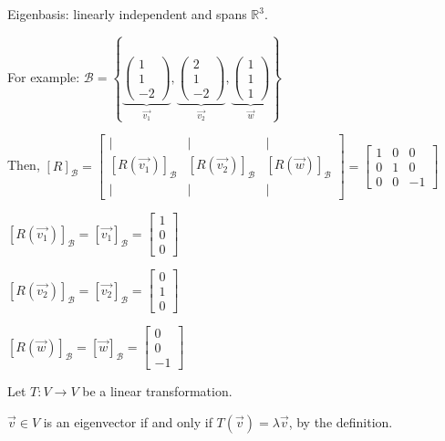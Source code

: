 \documentclass[11pt,fleqn]{book} %
\begin{document}
Eigenbasis: linearly independent and spans $\mathbb{R}^3$.

For example: $\mathcal{B} = \left\{
\underbrace{ \begin{pmatrix} 1\\1\\-2 \end{pmatrix} }_{\overrightarrow{v_1}},
\underbrace{ \begin{pmatrix} 2\\1\\-2 \end{pmatrix} }_{\overrightarrow{v_2}},
\underbrace{ \begin{pmatrix} 1\\1\\1 \end{pmatrix} }_{\overrightarrow{w}}
\right\}$

Then, $[R]_\mathcal{B} =
\begin{bmatrix} | &| &| \\ [R(\overrightarrow{v_1})]_\mathcal{B} &[R(\overrightarrow{v_2})]_\mathcal{B} &[R(\overrightarrow{w})]_\mathcal{B} \\ | &| &| \end{bmatrix} = \begin{bmatrix} 1 &0 &0 \\ 0 &1 &0 \\ 0 &0 &-1 \end{bmatrix}$

$[R(\overrightarrow{v_1})]_\mathcal{B} = [\overrightarrow{v_1}]_\mathcal{B} = \begin{bmatrix} 1\\0\\0 \end{bmatrix}$

$[R(\overrightarrow{v_2})]_\mathcal{B} = [\overrightarrow{v_2}]_\mathcal{B}=\begin{bmatrix} 0\\1\\0 \end{bmatrix}$

$[R(\overrightarrow{w})]_\mathcal{B} = [\overrightarrow{w}]_\mathcal{B}=\begin{bmatrix} 0\\0\\-1 \end{bmatrix}$

Let $T: V \to V$ be a linear transformation.

$\overrightarrow{v} \in V$  is an eigenvector if and only if $T(\overrightarrow{v}) = \lambda \overrightarrow{v}$, by the definition.
\end{document}
